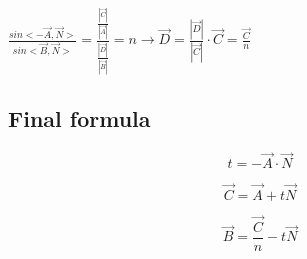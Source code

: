 \documentclass{article}
\begin{document}
$
\frac{sin<-\vec{A}, \vec{N}>}{sin<\vec{B}, \vec{N}>}
=
\frac{\frac{|\vec{C}|}{|\vec{A}|}}{\frac{|\vec{D}|}{|\vec{B}|}} = n
\rightarrow
\vec{D} = \frac{|\vec{D}|}{|\vec{C}|} \cdot \vec{C}
=
\frac{\vec{C}}{n}
$

\subsection{Final formula}
\begin{equation}
t = -\vec{A} \cdot \vec{N}
\end{equation}

\begin{equation}
\vec{C} = \vec{A} + t\vec{N}
\end{equation}

\begin{equation}
\vec{B} = \frac{\vec{C}}{n} - t\vec{N}
\end{equation}
\end{document}
